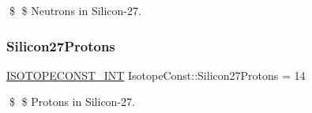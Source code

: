 \$ \$ Neutrons in Silicon-\/27. \mbox{\label{group___isotope_const-_silicon-_si27_ga3da3e772a81e07780e697997ce32375e}} 
\subsubsection{\texorpdfstring{Silicon27\+Protons}{Silicon27Protons}}
{\footnotesize\ttfamily \mbox{\hyperlink{group___isotope_const-_macros_ga5f18360b3e99483a35c32d789e62621c}{I\+S\+O\+T\+O\+P\+E\+C\+O\+N\+S\+T\+\_\+\+I\+NT}} Isotope\+Const\+::\+Silicon27\+Protons = 14}

\$ \$ Protons in Silicon-\/27. 